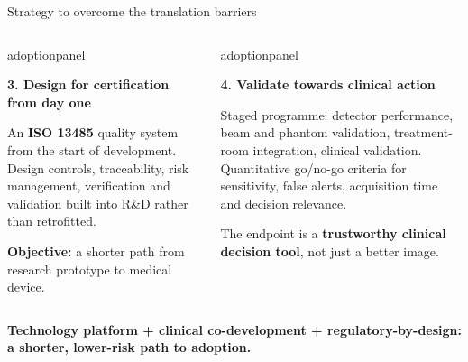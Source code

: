 \documentclass[aspectratio=169,11pt]{beamer}
\begin{document}
\begin{frame}{Strategy to overcome the translation barriers}
\begin{columns}[T,onlytextwidth]
\begin{beamercolorbox}[sep=6pt,wd=\linewidth]{adoptionpanel}
\begin{minipage}[t][2.3cm][t]{\linewidth}\raggedright
{\footnotesize\bfseries\color{crBlue}3. Design for certification from day one\par}
\vspace{0.07cm}
{\scriptsize An \textbf{ISO 13485} quality system from the start of development. Design controls, traceability, risk management, verification and validation built into R\&D rather than retrofitted.\par\vspace{0.06cm}
\textbf{Objective:} a shorter path from research prototype to medical device.\par}
\end{minipage}
\end{beamercolorbox}
\begin{beamercolorbox}[sep=6pt,wd=\linewidth]{adoptionpanel}
\begin{minipage}[t][2.3cm][t]{\linewidth}\raggedright
{\footnotesize\bfseries\color{crBlue}4. Validate towards clinical action\par}
\vspace{0.07cm}
{\scriptsize Staged programme: detector performance, beam and phantom validation, treatment-room integration, clinical validation. Quantitative go/no-go criteria for sensitivity, false alerts, acquisition time and decision relevance.\par\vspace{0.06cm}
The endpoint is a \textbf{trustworthy clinical decision tool}, not just a better image.\par}
\end{minipage}
\end{beamercolorbox}
\end{columns}
\vspace{0.14cm}
{\footnotesize\bfseries\color{darkred}Technology platform + clinical co-development + regulatory-by-design: a shorter, lower-risk path to adoption.\par}
\end{frame}








\end{document}
